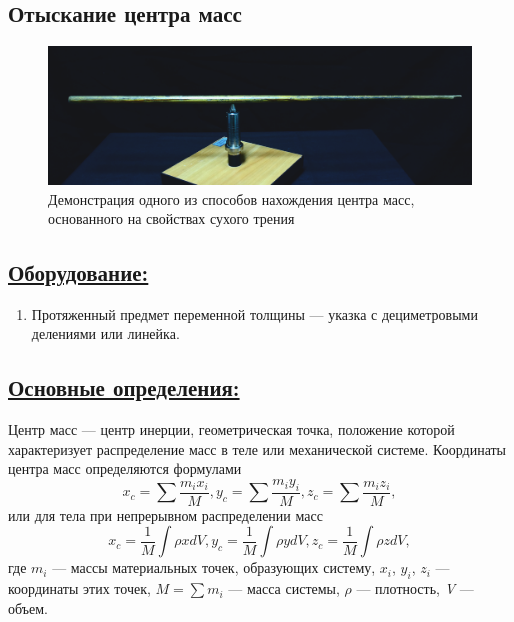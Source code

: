 \documentclass[14pt,a4paper,oneside]{extarticle}	%
\begin{document}
	
	\begin{center}
		\subsection*{Отыскание центра масс}
	\end{center}
	
	\begin{figure}[H] 	
		\centering 	
		\includegraphics[width=0.9\linewidth]{center-1.png}
		\caption{Демонстрация одного из способов нахождения центра масс, основанного на свойствах сухого трения}
		\label{center-1}
	\end{figure}
	
	\subsection*{\underline{Оборудование:}}
	
	\begin{enumerate} 
		\item Протяженный предмет переменной толщины — указка с дециметровыми делениями или линейка.
	\end{enumerate}

\subsection*{\underline{Основные определения:}}
	
Центр масс — центр инерции, геометрическая точка, положение которой характеризует распределение масс в теле или механической системе. 
Координаты центра масс определяются формулами
$$
	x_c =\sum \dfrac{m_i x_i}{M}, y_c =\sum \dfrac{m_i y_i}{M}, z_c =\sum \dfrac{m_i z_i}{M},
$$
	или для тела при непрерывном распределении масс
$$
	x_c = \dfrac1M \int \rho x dV, y_c =\dfrac1M \int \rho y dV, z_c =\dfrac1M \int \rho z dV,
$$
	где $ m_i $ — массы материальных точек, образующих систему, $ x_i $, $ y_i $, $ z_i $ — координаты этих точек, $ M = \sum m_i $ — масса системы, $ \rho $ — плотность, \textit{V} — объем. 
	
\end{document}
